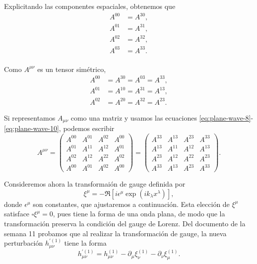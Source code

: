 \documentclass[letterpaper,11pt]{article}
\begin{document}
Explicitando las componentes espaciales, obtenemos que
\begin{align}
A^{00} &= A^{30}, \\
A^{01} &= A^{31}, \\
A^{02} &= A^{32}, \\
A^{03} &= A^{33}. \\
\end{align}

Como $A^{\mu\nu}$ es un tensor simétrico, 
\begin{align}
A^{00} &= A^{30} = A^{03} = A^{33}, \label{eq:plane-wave-8} \\
A^{01} &= A^{10} = A^{31} = A^{13}, \label{eq:plane-wave-9}\\
A^{02} &= A^{20} = A^{32} = A^{23}.\label{eq:plane-wave-10}
\end{align}

Si representamos $A_{\mu\nu}$ como una matriz y usamos las ecuaciones \eqref{eq:plane-wave-8}-\eqref{eq:plane-wave-10}, podemos escribir
\begin{equation}
A^{\mu\nu} = \begin{pmatrix}
A^{00} & A^{01} & A^{02} & A^{00} \\
A^{01} & A^{11} & A^{12} & A^{01} \\
A^{02} & A^{12} & A^{22} & A^{02} \\
A^{00} & A^{01} & A^{02} & A^{00} 
\end{pmatrix} = \begin{pmatrix}
A^{33} & A^{13} & A^{23} & A^{33} \\
A^{13} & A^{11} & A^{12} & A^{13} \\
A^{23} & A^{12} & A^{22} & A^{23} \\
A^{33} & A^{13} & A^{23} & A^{33} 
\end{pmatrix}. \label{eq:plane-wave-11}
\end{equation}

Consideremos ahora la transformaión de gauge definida por
\begin{equation}
\xi^{\mu} = - \Re\left[i \epsilon^{\mu} \exp(i k_{\lambda} x^{\lambda}) \right], \label{eq:plane-wave-12}
\end{equation}
donde $\epsilon^{\mu}$ son constantes, que ajustaremos a continuación. Esta elección de $\xi^{\mu}$ satisface $\square \xi^{\mu} = 0$, pues tiene la forma de una onda plana, de modo que la transformación preserva la condición del gauge de Lorenz.  
Del documento de la semana 11 probamos que al realizar la transformación de gauge, la nueva perturbación $h_{\mu\nu}^{'(1)}$ tiene la forma
\begin{equation}
h_{\mu\nu}^{'(1)} = h_{\mu\nu}^{(1)} - \partial_{\mu} \xi_{\nu}^{(1)} - \partial_{\nu} \xi_{\mu}^{(1)}. \label{eq:plane-wave-13}
\end{equation}
\end{document}
